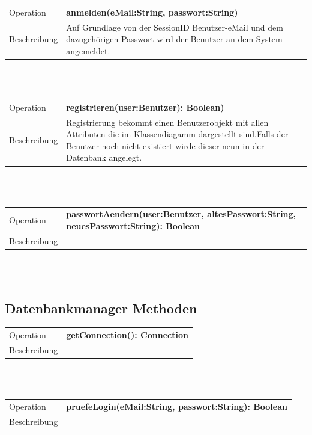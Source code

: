 \documentclass[12pt]{scrreprt}
\begin{document}
\begin{tabular}{|lp{12cm}|}
	\hline
	Operation &  \textbf{anmelden(eMail:String, passwort:String) }\\ 
	Beschreibung & Auf Grundlage von der SessionID Benutzer-eMail und dem dazugehörigen Passwort wird der Benutzer an dem System angemeldet.\\ 
	\hline 
\end{tabular} \\\\

\begin{tabular}{|lp{12cm}|}
	\hline
	Operation &  \textbf{registrieren(user:Benutzer): Boolean) }\\ 
	Beschreibung & Registrierung bekommt einen Benutzerobjekt mit allen Attributen die im Klassendiagamm dargestellt sind.Falls der Benutzer noch nicht existiert wirde dieser neun in der Datenbank angelegt. \\ 
	\hline 
\end{tabular} \\\\

\begin{tabular}{|lp{12cm}|}
	\hline
	Operation &  \textbf{passwortAendern(user:Benutzer, altesPasswort:String, neuesPasswort:String): Boolean }\\ 
	Beschreibung & \\ 
	\hline 
\end{tabular} \\\\


\subsection{Datenbankmanager  Methoden}
\begin{tabular}{|lp{12cm}|}
	\hline
	Operation &  \textbf{getConnection(): Connection}\\ 
	Beschreibung & \\ 
	\hline 
\end{tabular} \\\\

\begin{tabular}{|lp{12cm}|}
	\hline
	Operation &  \textbf{pruefeLogin(eMail:String, passwort:String): Boolean}\\ 
	Beschreibung & \\ 
	\hline 
\end{tabular} \\\\
\end{document}
